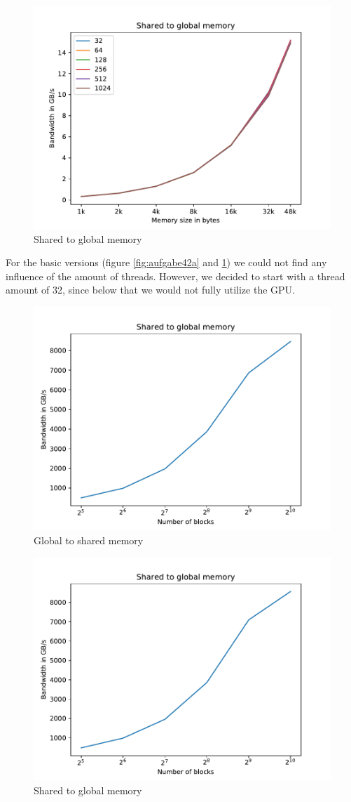 \documentclass[12pt]{article}
\begin{document}
\begin{figure}[H]
	\centering
	\includegraphics[width=0.7\linewidth]{../../template/plots/aufgabe4_2b}
	\caption{Shared to global memory}
	\label{fig:aufgabe42b}
\end{figure}

For the basic versions (figure \ref{fig:aufgabe42a} and \ref{fig:aufgabe42b}) we could not find any influence of the amount of threads. However, we decided to start with a thread amount of 32, since below that we would not fully utilize the GPU.

\begin{figure}[H]
	\centering
	\includegraphics[width=0.7\linewidth]{../../template/plots/aufgabe4_2c}
	\caption{Global to shared memory}
	\label{fig:aufgabe42c}
\end{figure}

\begin{figure}[H]
	\centering
	\includegraphics[width=0.7\linewidth]{../../template/plots/aufgabe4_2d}
	\caption{Shared to global memory}
	\label{fig:aufgabe42d}
\end{figure}
\end{document}
